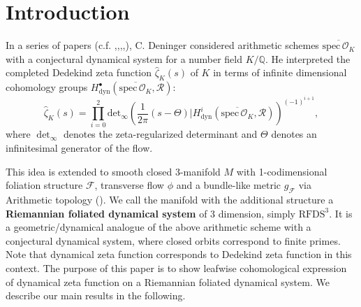 \section{Introduction}

In a series of papers (c.f. \cite{deninger1998some},\cite{deninger2002number},\cite{deninger2005arithmetic},\cite{deninger2006dynamical},\cite{deninger2008analogies}), C. Deninger considered arithmetic schemes $\overline{\mathrm{spec}\,\mathcal{O}_{K}}$ with a conjectural dynamical system for a number field $K/\mathbb{Q}$.
He interpreted the completed Dedekind zeta function $\hat{\zeta}_{K}(s)$ of $K$ in terms of infinite dimensional cohomology groups $H^{\bullet}_{\mathrm{dyn}}(\overline{\mathrm{spec}\,\mathcal{O}_{K}},\mathcal{R})$:
\begin{equation*}
    \hat{\zeta}_{K}(s)=\prod_{i=0}^{2} \mathrm{det}_{\infty} \left(\frac{1}{2\pi}(s-\Theta)|H^{i}_{\mathrm{dyn}}(\overline{\mathrm{spec}\,\mathcal{O}_{K}},\mathcal{R}) \right)^{(-1)^{i+1}},
\end{equation*}
where $\det_{\infty}$ denotes the zeta-regularized determinant and $\Theta$ denotes an infinitesimal generator of the flow.

This idea is extended to smooth closed 3-manifold $M$ with 1-codimensional foliation structure $\mathcal{F}$, transverse flow $\phi$ and a bundle-like metric $g_{\mathcal{F}}$ via Arithmetic topology (\cite{morishita2011knots}).
We call the manifold with the additional structure a \textbf{Riemannian foliated dynamical system} of 3 dimension, simply $\mathrm{RFDS}^3$.
It is a geometric/dynamical analogue of the above arithmetic scheme with a conjectural dynamical system, where closed orbits correspond to finite primes.
Note that dynamical zeta function corresponds to Dedekind zeta function in this context.
The purpose of this paper is to show leafwise cohomological expression of dynamical zeta function on a Riemannian foliated dynamical system.
We describe our main results in the following. \\

